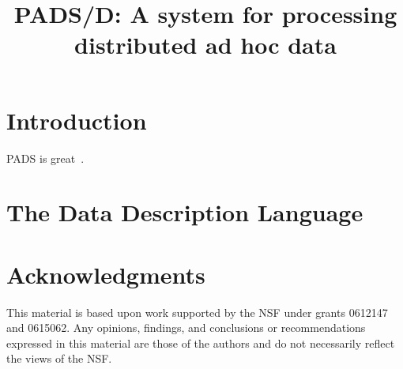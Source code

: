 \documentclass[nocopyrightspace]{sigplanconf}
\begin{document}
\title{PADS/D: A system for processing distributed ad hoc data}

       {}
       {}
       {}
       {}


\maketitle{}

\begin{abstract}  

\end{abstract}


\section {Introduction}
\label{sec:intro}

PADS is great~\cite{fisher+:pads,fisher+:popl06}.

\section{The Data Description Language}
\label{sec:semantics}


\section*{Acknowledgments}

This material is based upon work 
supported by the NSF
   under grants 0612147 and 0615062.
Any opinions, findings, and conclusions or recommendations
   expressed in this material are those of the authors and do not
   necessarily reflect the views of the NSF.



\end{document}
